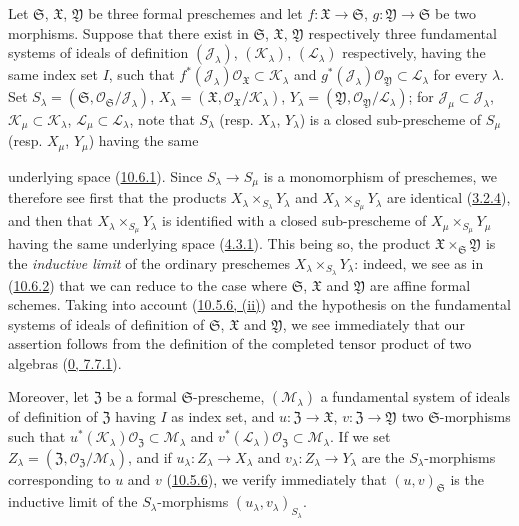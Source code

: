 \begin{env}[10.7.4]
\label{I.10.7.4}
Let $\mathfrak{S}$, $\mathfrak{X}$, $\mathfrak{Y}$ be three formal
preschemes and let $f:\mathfrak{X}\to\mathfrak{S}$,
$g:\mathfrak{Y}\to\mathfrak{S}$ be two morphisms. Suppose that there
exist in $\mathfrak{S}$, $\mathfrak{X}$, $\mathfrak{Y}$ respectively
three fundamental systems of ideals of definition
$(\mathscr{J}_\lambda)$, $(\mathscr{K}_\lambda)$,
$(\mathscr{L}_\lambda)$ respectively, having the same index set
$I$, such that
$f^*(\mathscr{J}_\lambda)\mathscr{O}_{\mathfrak{X}}
\subset\mathscr{K}_\lambda$ and
$g^*(\mathscr{J}_\lambda)\mathscr{O}_{\mathfrak{Y}}
\subset\mathscr{L}_\lambda$ for every $\lambda$. Set
$S_\lambda=(\mathfrak{S},
\mathscr{O}_{\mathfrak{S}}/\mathscr{J}_\lambda)$,
$X_\lambda=(\mathfrak{X},
\mathscr{O}_{\mathfrak{X}}/\mathscr{K}_\lambda)$,
$Y_\lambda=(\mathfrak{Y},
\mathscr{O}_{\mathfrak{Y}}/\mathscr{L}_\lambda)$; for
$\mathscr{J}_\mu\subset\mathscr{J}_\lambda$,
$\mathscr{K}_\mu\subset\mathscr{K}_\lambda$,
$\mathscr{L}_\mu\subset\mathscr{L}_\lambda$, note that
$S_\lambda$ (resp. $X_\lambda$, $Y_\lambda$) is a closed sub-prescheme
of $S_\mu$ (resp. $X_\mu$, $Y_\mu$) having the same


underlying space (\hyperref[I.10.6.1]{10.6.1}). Since
$S_\lambda\to S_\mu$ is a monomorphism of preschemes, we therefore see
first that the products
$X_\lambda\times_{S_\lambda}Y_\lambda$ and
$X_\lambda\times_{S_\mu}Y_\lambda$ are identical
(\hyperref[I.3.2.4]{3.2.4}), and then that
$X_\lambda\times_{S_\mu}Y_\lambda$ is identified with a closed
sub-prescheme of $X_\mu\times_{S_\mu}Y_\mu$ having the same underlying
space (\hyperref[I.4.3.1]{4.3.1}). This being so, the product
$\mathfrak{X}\times_{\mathfrak{S}}\mathfrak{Y}$ is the
\emph{inductive limit} of the ordinary preschemes
$X_\lambda\times_{S_\lambda}Y_\lambda$: indeed, we see as in
(\hyperref[I.10.6.2]{10.6.2}) that we can reduce to the case where
$\mathfrak{S}$, $\mathfrak{X}$ and $\mathfrak{Y}$ are affine formal
schemes. Taking into account (\hyperref[I.10.5.6]{10.5.6, (ii)}) and
the hypothesis on the fundamental systems of ideals of definition of
$\mathfrak{S}$, $\mathfrak{X}$ and $\mathfrak{Y}$, we see immediately
that our assertion follows from the definition of the completed tensor
product of two algebras (\hyperref[0.7.7.1]{0, 7.7.1}).

Moreover, let $\mathfrak{Z}$ be a formal $\mathfrak{S}$-prescheme,
$(\mathscr{M}_\lambda)$ a fundamental system of ideals of definition of
$\mathfrak{Z}$ having $I$ as index set, and
$u:\mathfrak{Z}\to\mathfrak{X}$,
$v:\mathfrak{Z}\to\mathfrak{Y}$ two $\mathfrak{S}$-morphisms such that
$u^*(\mathscr{K}_\lambda)\mathscr{O}_{\mathfrak{Z}}
\subset\mathscr{M}_\lambda$ and
$v^*(\mathscr{L}_\lambda)\mathscr{O}_{\mathfrak{Z}}
\subset\mathscr{M}_\lambda$. If we set
$Z_\lambda=(\mathfrak{Z},
\mathscr{O}_{\mathfrak{Z}}/\mathscr{M}_\lambda)$, and if
$u_\lambda:Z_\lambda\to X_\lambda$ and
$v_\lambda:Z_\lambda\to Y_\lambda$ are the $S_\lambda$-morphisms
corresponding to $u$ and $v$ (\hyperref[I.10.5.6]{10.5.6}), we
verify immediately that $(u,v)_{\mathfrak{S}}$ is the inductive limit
of the $S_\lambda$-morphisms $(u_\lambda,v_\lambda)_{S_\lambda}$.


\end{env}
